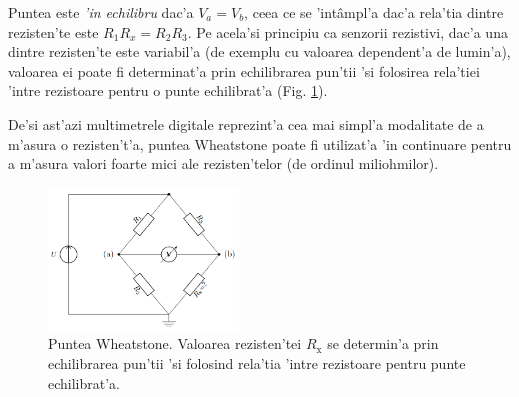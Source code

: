 Puntea este \textit{'in echilibru} dac'a $V_a=V_b$, ceea ce se 'int\^ampl'a dac'a rela'tia dintre rezisten'te este $R_1 R_x = R_2 R_3$. Pe acela'si principiu ca senzorii rezistivi, dac'a una dintre rezisten'te este variabil'a (de exemplu cu valoarea dependent'a de lumin'a), valoarea ei poate fi determinat'a prin echilibrarea pun'tii 'si folosirea rela'tiei 'intre rezistoare pentru o punte echilibrat'a (Fig. \ref{fig:punte_Wheatstone}).

De'si ast'azi multimetrele digitale reprezint'a cea mai simpl'a modalitate de a m'asura o rezisten't'a, puntea Wheatstone poate fi utilizat'a 'in continuare pentru a m'asura valori foarte mici ale rezisten'telor (de ordinul miliohmilor).

\begin{figure}[h]
	\centering
		\includegraphics[width=0.45\textwidth]{laborator_01/figuri/6_punte_Wheatstone}
	\caption{Puntea Wheatstone. Valoarea rezisten'tei $R_\mathrm{x}$ se determin'a prin echilibrarea pun'tii 'si folosind rela'tia 'intre rezistoare pentru punte echilibrat'a.}
	\label{fig:punte_Wheatstone}
\end{figure}
